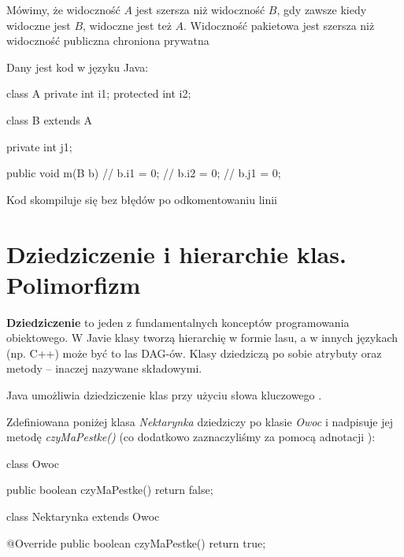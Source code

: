 \begin{problems}
    \prob Mówimy, że widoczność $A$ jest szersza niż widoczność $B$, gdy zawsze kiedy widoczne jest $B$, widoczne jest też $A$. Widoczność pakietowa jest szersza niż widoczność
    \answers
    {publiczna}
    {chroniona}
    {prywatna}
        
    \prob Dany jest kod w języku Java:
    \begin{java}
        class A {
            private int i1;
            protected int i2;
        }
        
        class B extends A {
            private int j1;
            
            public void m(B b) {
                // b.i1 = 0;
                // b.i2 = 0;
                // b.j1 = 0;
            }
        }    
    \end{java}
    Kod skompiluje się bez błędów po odkomentowaniu linii
    \answers
    {}
    {}
    {}
\end{problems}

\section{Dziedziczenie i hierarchie klas. Polimorfizm}

\textbf{Dziedziczenie} to jeden z fundamentalnych konceptów programowania obiektowego. W Javie klasy tworzą hierarchię w formie lasu, a w innych językach (np. C++) może być to las DAG-ów. Klasy dziedziczą po sobie atrybuty oraz metody -- inaczej nazywane składowymi.

Java umożliwia dziedziczenie klas przy użyciu słowa kluczowego .

\begin{example}
    Zdefiniowana poniżej klasa \textit{Nektarynka} dziedziczy po klasie \textit{Owoc} i nadpisuje jej metodę \textit{czyMaPestke()} (co dodatkowo zaznaczyliśmy za pomocą adnotacji ):
    \begin{java}
        class Owoc {
    
            public boolean czyMaPestke() {
                return false;
            }
        }
    
        class Nektarynka extends Owoc {
        
            @Override
            public boolean czyMaPestke() {
                return true;
            }
        }
    \end{java}
\end{example}
    
